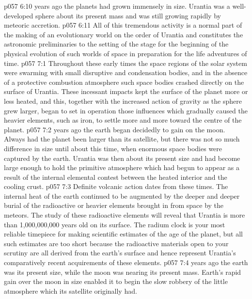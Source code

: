 \vs p057 6:10 \pc {} years ago the planets had grown immensely in size. Urantia was a well\hyp{}developed sphere about  its present mass and was still growing rapidly by meteoric accretion.
\vs p057 6:11 All of this tremendous activity is a normal part of the making of an evolutionary world on the order of Urantia and constitutes the astronomic preliminaries to the setting of the stage for the beginning of the physical evolution of such worlds of space in preparation for the life adventures of time.
\vs p057 7:1 Throughout these early times the space regions of the solar system were swarming with small disruptive and condensation bodies, and in the absence of a protective combustion atmosphere such space bodies crashed directly on the surface of Urantia. These incessant impacts kept the surface of the planet more or less heated, and this, together with the increased action of gravity as the sphere grew larger, began to set in operation those influences which gradually caused the heavier elements, such as iron, to settle more and more toward the centre of the planet.
\vs p057 7:2 \pc {} years ago the earth began decidedly to gain on the moon. Always had the planet been larger than its satellite, but there was not so much difference in size until about this time, when enormous space bodies were captured by the earth. Urantia was then about  its present size and had become large enough to hold the primitive atmosphere which had begun to appear as a result of the internal elemental contest between the heated interior and the cooling crust.
\vs p057 7:3 Definite volcanic action dates from these times. The internal heat of the earth continued to be augmented by the deeper and deeper burial of the radioactive or heavier elements brought in from space by the meteors. The study of these radioactive elements will reveal that Urantia is more than 1,000,000,000 years old on its surface. The radium clock is your most reliable timepiece for making scientific estimates of the age of the planet, but all such estimates are too short because the radioactive materials open to your scrutiny are all derived from the earth’s surface and hence represent Urantia’s comparatively recent acquirements of these elements.
\vs p057 7:4 \pc {} years ago the earth was  its present size, while the moon was nearing its present mass. Earth’s rapid gain over the moon in size enabled it to begin the slow robbery of the little atmosphere which its satellite originally had.
